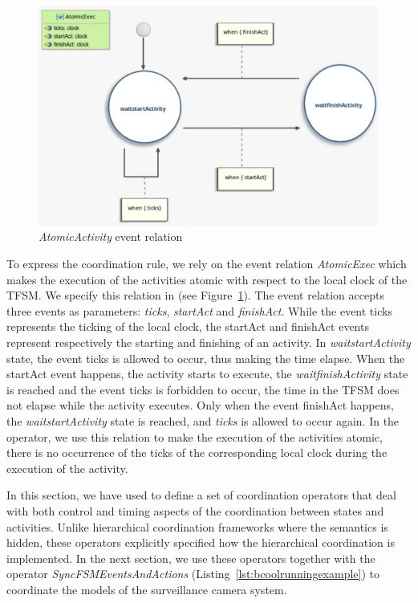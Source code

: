 \begin{figure}
	\center
	\includegraphics[width=.7\columnwidth]{examples/figs/AtomicExec}
	\caption{\emph{AtomicActivity} event relation}
	\label{fig:atomicexec}
\end{figure}

To express the coordination rule, we rely on the event relation \emph{AtomicExec} which makes the execution of the activities atomic with respect to the local clock of the TFSM. We specify this relation in \moccml (see Figure~\ref{fig:atomicexec}). The event relation accepts three events as parameters: \emph{ticks}, \emph{startAct} and \emph{finishAct}. While the event ticks represents the ticking of the local clock, the startAct and finishAct events represent respectively the starting and finishing of an activity. In \emph{waitstartActivity} state, the event ticks is allowed to occur, thus making the time elapse. When the startAct event happens, \ie the activity starts to execute, the \emph{waitfinishActivity} state is reached and the event ticks is forbidden to occur, \ie the time in the TFSM does not elapse while the activity executes. Only when the event finishAct happens, the \emph{waitstartActivity} state is reached, and \emph{ticks} is allowed to occur again. In the operator, we use this relation to make the execution of the activities atomic, \ie there is no occurrence of the \dse ticks of the corresponding local clock during the execution of the activity.

In this section, we have used \bcool to define a set of coordination operators that deal with both control and timing aspects of the coordination between states and activities. Unlike hierarchical coordination frameworks where the semantics is hidden, these operators explicitly specified how the hierarchical coordination is implemented. In the next section, we use these operators together with the operator \emph{SyncFSMEventsAndActions} (Listing~\ref{lst:bcoolrunningexample}) to coordinate the models of the surveillance camera system.







